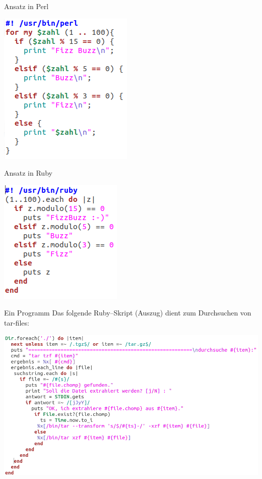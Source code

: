 \begin{frame}{Ansatz in Perl}
  \begin{center}
    \includegraphics[height=0.6\textheight]{pics/fizzbuzz-perl.png}
  \end{center}
\end{frame}
%
\begin{frame}{Ansatz in Ruby}
  \begin{center}
    \includegraphics[height=0.6\textheight]{pics/fizzbuzz-ruby.png}
  \end{center}
\end{frame}

\begin{frame}{Ein Programm}
  Das folgende Ruby--Skript (Auszug) dient zum Durchsuchen von tar-files:
  
  \begin{center}
    \includegraphics[height=0.7\textheight]{pics/tarsearch-ruby.png}
  \end{center}
\end{frame}

